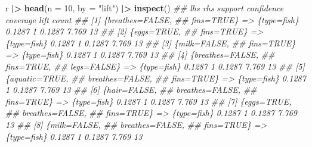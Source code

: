 \documentclass[
  notitlepage]{book}
\newenvironment{Shaded}{\begin{snugshade}}{\end{snugshade}}
\newcommand{\CommentTok}[1]{\textcolor[rgb]{0.56,0.35,0.01}{\textit{#1}}}
\newcommand{\DataTypeTok}[1]{\textcolor[rgb]{0.13,0.29,0.53}{#1}}
\newcommand{\DecValTok}[1]{\textcolor[rgb]{0.00,0.00,0.81}{#1}}
\newcommand{\ErrorTok}[1]{\textcolor[rgb]{0.64,0.00,0.00}{\textbf{#1}}}
\newcommand{\KeywordTok}[1]{\textcolor[rgb]{0.13,0.29,0.53}{\textbf{#1}}}
\newcommand{\NormalTok}[1]{#1}
\newcommand{\OperatorTok}[1]{\textcolor[rgb]{0.81,0.36,0.00}{\textbf{#1}}}
\newcommand{\StringTok}[1]{\textcolor[rgb]{0.31,0.60,0.02}{#1}}
\begin{document}
\begin{Shaded}
\begin{Highlighting}[]
\NormalTok{r }\OperatorTok{|}\ErrorTok{\textgreater{}}\StringTok{ }\KeywordTok{head}\NormalTok{(}\DataTypeTok{n =} \DecValTok{10}\NormalTok{, }\DataTypeTok{by =} \StringTok{"lift"}\NormalTok{) }\OperatorTok{|}\ErrorTok{\textgreater{}}\StringTok{ }\KeywordTok{inspect}\NormalTok{()}
\CommentTok{\#\#      lhs                  rhs         support confidence coverage  lift count}
\CommentTok{\#\# [1]  \{breathes=FALSE,                                                        }
\CommentTok{\#\#       fins=TRUE\}       =\textgreater{} \{type=fish\}  0.1287          1   0.1287 7.769    13}
\CommentTok{\#\# [2]  \{eggs=TRUE,                                                             }
\CommentTok{\#\#       fins=TRUE\}       =\textgreater{} \{type=fish\}  0.1287          1   0.1287 7.769    13}
\CommentTok{\#\# [3]  \{milk=FALSE,                                                            }
\CommentTok{\#\#       fins=TRUE\}       =\textgreater{} \{type=fish\}  0.1287          1   0.1287 7.769    13}
\CommentTok{\#\# [4]  \{breathes=FALSE,                                                        }
\CommentTok{\#\#       fins=TRUE,                                                             }
\CommentTok{\#\#       legs=FALSE\}      =\textgreater{} \{type=fish\}  0.1287          1   0.1287 7.769    13}
\CommentTok{\#\# [5]  \{aquatic=TRUE,                                                          }
\CommentTok{\#\#       breathes=FALSE,                                                        }
\CommentTok{\#\#       fins=TRUE\}       =\textgreater{} \{type=fish\}  0.1287          1   0.1287 7.769    13}
\CommentTok{\#\# [6]  \{hair=FALSE,                                                            }
\CommentTok{\#\#       breathes=FALSE,                                                        }
\CommentTok{\#\#       fins=TRUE\}       =\textgreater{} \{type=fish\}  0.1287          1   0.1287 7.769    13}
\CommentTok{\#\# [7]  \{eggs=TRUE,                                                             }
\CommentTok{\#\#       breathes=FALSE,                                                        }
\CommentTok{\#\#       fins=TRUE\}       =\textgreater{} \{type=fish\}  0.1287          1   0.1287 7.769    13}
\CommentTok{\#\# [8]  \{milk=FALSE,                                                            }
\CommentTok{\#\#       breathes=FALSE,                                                        }
\CommentTok{\#\#       fins=TRUE\}       =\textgreater{} \{type=fish\}  0.1287          1   0.1287 7.769    13}

\end{Highlighting}
\end{Shaded}
\end{document}
